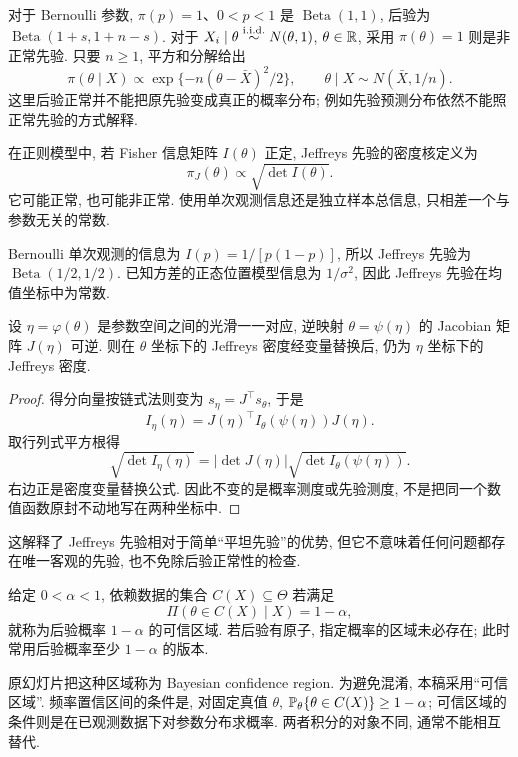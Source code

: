 对于 Bernoulli 参数, $\pi(p)=1$、$0<p<1$ 是 $\operatorname{Beta}(1,1)$, 后验为 $\operatorname{Beta}(1+s,1+n-s)$. 对于 $X_i\mid\theta\stackrel{\mathrm{i.i.d.}}{\sim} N(\theta,1)$, $\theta\in\mathbb R$, 采用 $\pi(\theta)=1$ 则是非正常先验. 只要 $n\geq1$, 平方和分解给出
\[
 \pi(\theta\mid X)\propto\exp\{-n(\theta-\bar X)^2/2\},\qquad
 \theta\mid X\sim N(\bar X,1/n).
\]
这里后验正常并不能把原先验变成真正的概率分布; 例如先验预测分布依然不能照正常先验的方式解释. 

\begin{definition}[Jeffreys 先验]
在正则模型中, 若 Fisher 信息矩阵 $I(\theta)$ 正定, Jeffreys 先验的密度核定义为
\[
 \pi_J(\theta)\propto\sqrt{\det I(\theta)}.
\]
它可能正常, 也可能非正常. 使用单次观测信息还是独立样本总信息, 只相差一个与参数无关的常数. 
\end{definition}
Bernoulli 单次观测的信息为 $I(p)=1/[p(1-p)]$, 所以 Jeffreys 先验为 $\operatorname{Beta}(1/2,1/2)$. 已知方差的正态位置模型信息为 $1/\sigma^2$, 因此 Jeffreys 先验在均值坐标中为常数. 

\begin{proposition}[光滑重参数化不变性]
设 $\eta=\varphi(\theta)$ 是参数空间之间的光滑一一对应, 逆映射 $\theta=\psi(\eta)$ 的 Jacobian 矩阵 $J(\eta)$ 可逆. 则在 $\theta$ 坐标下的 Jeffreys 密度经变量替换后, 仍为 $\eta$ 坐标下的 Jeffreys 密度. 
\end{proposition}
\begin{proof}
得分向量按链式法则变为 $s_\eta=J^\top s_\theta$, 于是
\[
 I_\eta(\eta)=J(\eta)^\top I_\theta(\psi(\eta))J(\eta).
\]
取行列式平方根得
\[
 \sqrt{\det I_\eta(\eta)}
 =|\det J(\eta)|\sqrt{\det I_\theta(\psi(\eta))}.
\]
右边正是密度变量替换公式. 因此不变的是概率测度或先验测度, 不是把同一个数值函数原封不动地写在两种坐标中. 
\end{proof}
这解释了 Jeffreys 先验相对于简单“平坦先验”的优势, 但它不意味着任何问题都存在唯一客观的先验, 也不免除后验正常性的检查. 

\begin{definition}[后验可信区域]
给定 $0<\alpha<1$, 依赖数据的集合 $C(X)\subseteq\Theta$ 若满足
\[
 \Pi(\theta\in C(X)\mid X)=1-\alpha,
\]
就称为后验概率 $1-\alpha$ 的可信区域. 若后验有原子, 指定概率的区域未必存在; 此时常用后验概率至少 $1-\alpha$ 的版本. 
\end{definition}
原幻灯片把这种区域称为 Bayesian confidence region. 为避免混淆, 本稿采用“可信区域”. 频率置信区间的条件是, 对固定真值 $\theta$, $\mathbb P_\theta\{\theta\in C(X)\}\geq1-\alpha$; 可信区域的条件则是在已观测数据下对参数分布求概率. 两者积分的对象不同, 通常不能相互替代. 

